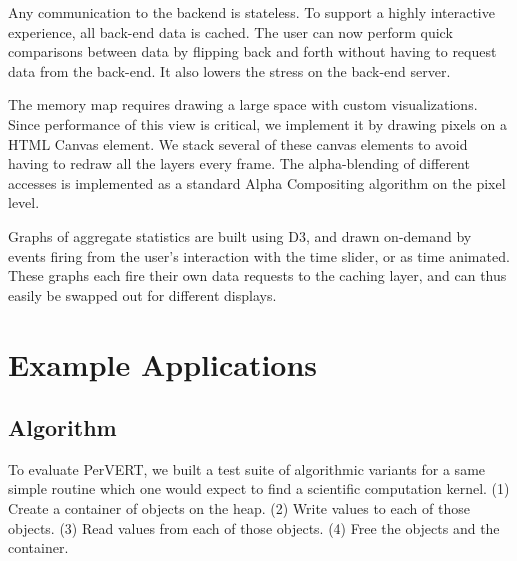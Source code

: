 \documentclass[annual]{acmsiggraph}
\begin{document}
    Any communication to the backend is stateless. To support a highly interactive experience, all back-end data is cached. The user can now perform quick comparisons between data by flipping back and forth without having to request data from the back-end. It also lowers the stress on the back-end server.
    
    The memory map requires drawing a large space with custom visualizations. Since performance of this view is critical, we implement it by drawing pixels on a HTML Canvas element. We stack several of these canvas elements to avoid having to redraw all the layers every frame. The alpha-blending of different accesses is implemented as a standard Alpha Compositing algorithm on the pixel level.
    
    Graphs of aggregate statistics are built using D3, and drawn on-demand by events firing from the user's interaction with the time slider, or as time animated. These graphs each fire their own data requests to the caching layer, and can thus easily be swapped out for different displays.
    
  

\section{Example Applications}\label{ch_e}

  \subsection{Algorithm}
    To evaluate PerVERT, we built a test suite of algorithmic variants for a same simple routine
      which one would expect to find a scientific computation kernel.
    (1) Create a container of objects on the heap.
    (2) Write values to each of those objects.
    (3) Read values from each of those objects.
    (4) Free the objects and the container.
\end{document}
